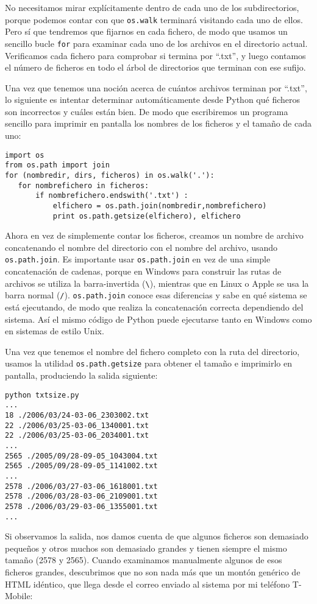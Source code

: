 No necesitamos mirar explícitamente dentro de cada uno de los subdirectorios,
porque podemos contar con que {\tt os.walk} terminará visitando cada
uno de ellos. Pero sí que tendremos que fijarnos en cada fichero, de
modo que usamos un sencillo bucle {\tt for} para examinar cada uno de los archivos
en el directorio actual. Verificamos cada fichero para comprobar si
termina por ``.txt'', y luego contamos el número de
ficheros en todo el árbol de directorios que terminan con ese
sufijo.

Una vez que tenemos una noción acerca de cuántos archivos terminan por ``.txt'', lo
siguiente es intentar determinar automáticamente
desde Python qué ficheros son incorrectos y cuáles están bien.
De modo que escribiremos un programa sencillo para imprimir en pantalla los
nombres de los ficheros y el tamaño de cada uno:

\beforeverb
\begin{verbatim}
import os
from os.path import join
for (nombredir, dirs, ficheros) in os.walk('.'):
   for nombrefichero in ficheros:
       if nombrefichero.endswith('.txt') :
           elfichero = os.path.join(nombredir,nombrefichero)
           print os.path.getsize(elfichero), elfichero
\end{verbatim}
\afterverb
%
Ahora en vez de simplemente contar los ficheros, creamos
un nombre de archivo concatenando el nombre del directorio con
el nombre del archivo, usando {\tt os.path.join}.
Es importante usar
{\tt os.path.join} en vez de una simple concatenación de cadenas,
porque en Windows para construir las rutas de archivos
se utiliza la barra-invertida (\verb"\"), mientras que en Linux
o Apple se usa la barra normal (\verb"/").
{\tt os.path.join} conoce esas diferencias y sabe en qué
sistema se está ejecutando, de modo que realiza la concatenación correcta
dependiendo del sistema. Así el mismo código de Python
puede ejecutarse tanto en Windows como en sistemas de estilo Unix.

Una vez que tenemos el nombre del fichero completo con la ruta
del directorio, usamos la utilidad {\tt os.path.getsize}
para obtener el tamaño e imprimirlo en pantalla, produciendo la
salida siguiente:

\beforeverb
\begin{verbatim}
python txtsize.py
...
18 ./2006/03/24-03-06_2303002.txt
22 ./2006/03/25-03-06_1340001.txt
22 ./2006/03/25-03-06_2034001.txt
...
2565 ./2005/09/28-09-05_1043004.txt
2565 ./2005/09/28-09-05_1141002.txt
...
2578 ./2006/03/27-03-06_1618001.txt
2578 ./2006/03/28-03-06_2109001.txt
2578 ./2006/03/29-03-06_1355001.txt
...
\end{verbatim}
\afterverb
%
Si observamos la salida, nos damos cuenta de que algunos ficheros son demasiado pequeños y
otros muchos son demasiado grandes y tienen siempre el mismo tamaño (2578 y 2565).
Cuando examinamos manualmente algunos de esos ficheros grandes,
descubrimos que no son nada más que un montón genérico de HTML idéntico, que llega
desde el correo enviado al sistema por mi teléfono T-Mobile:

